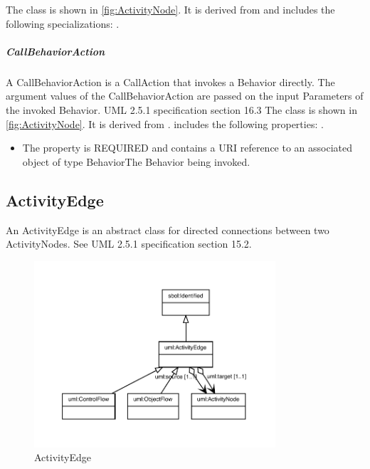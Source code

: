\linebreak%
\linebreak%
The  class is shown in \ref{fig:ActivityNode}. It is derived from  and includes the following specializations: . %
%
\subparagraph{CallBehaviorAction}%
\label{sec:uml:CallBehaviorAction}%
A CallBehaviorAction is a CallAction that invokes a Behavior directly. The argument values of the CallBehaviorAction are passed on the input Parameters of the invoked Behavior. UML 2.5.1 specification section 16.3%
\linebreak%
\linebreak%
The  class is shown in \ref{fig:ActivityNode}. It is derived from .%
 includes the following properties: . %
\begin{itemize}%
\item%
The  property is REQUIRED and contains a URI reference to an associated object of type BehaviorThe Behavior being invoked.%
\end{itemize}%
\subsection{ActivityEdge}%
\label{sec:uml:ActivityEdge}%
An ActivityEdge is an abstract class for directed connections between two ActivityNodes. See UML 2.5.1 specification section 15.2.%
\linebreak%
\linebreak%


\begin{figure}[h!]%
\centering%
\includegraphics[width=0.8\textwidth]{uml_classes/ActivityEdge_abstraction_hierarchy.pdf}%
\caption{ActivityEdge}%
\label{fig:ActivityEdge}%
\end{figure}

